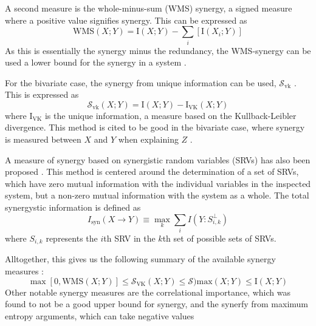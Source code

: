 \documentclass[../main.tex]{subfiles}
\begin{document}
A second measure is the whole-minus-sum (WMS) synergy, a signed measure where a positive value
signifies synergy.
This can be expressed as
%
\begin{equation}
\mathrm{WMS}(X;Y) = \mathrm{I}(X;Y) - \sum_i [\mathrm{I}(X_i;Y)]
\label{WMS}
\end{equation}
%
As this is essentially the synergy minus the redundancy, the WMS-synergy can be used a lower bound for the synergy in a system \cite{griffith2014quantifying, olbrich2015information}.

For the bivariate case, the synergy from unique information can be used, $\mathcal{S}_\mathrm{vk}$ \cite{bertschinger2014quantifying, griffith2014quantifying, olbrich2015information}.
This is expressed as
\begin{equation}
\mathcal{S}_\mathrm{vk} (X;Y) = \mathrm{I}(X;Y) - \mathrm{I}_\mathrm{VK} (X;Y)
\end{equation}
%
where $\mathrm{I}_\mathrm{VK}$ is the unique information, a measure based on the Kullback-Leibler divergence.
This method is cited to be good in the bivariate case, where synergy is measured between $X$ and $Y$ when explaining $Z$ \cite{olbrich2015information}.

A measure of synergy based on synergistic random variables (SRVs) has also been proposed \cite{quax2017quantifying}.
This method is centered around the determination of a set of SRVs, which have zero mutual information with the individual variables in the inspected system, but a non-zero mutual information with the system as a whole.
The total synergystic information is defined as
\begin{equation}
\label{SRV}
I_\mathrm{syn}(X \rightarrow Y) \equiv \max_k \sum_i I(Y : S_{i,k}^\perp)
\end{equation}
where $S_{i,k}$ represents the $i$th SRV in the $k$th set of possible sets of SRVs.

Alltogether, this gives us the following summary of the available synergy measures \cite{griffith2014quantifying}:
%
\begin{equation}
\max [0,\mathrm{WMS}(X;Y)] \le \mathcal{S}_\mathrm{VK} (X;Y) \le \mathcal{S})\mathrm{max} (X;Y) \le \mathrm{I}(X;Y)
\end{equation}
%
Other notable synergy measures are the correlational importance, which was found to not be a good upper bound for synergy, and the synerfy from maximum entropy arguments, which can take negative values \cite{griffith2014quantifying, olbrich2015information}
\end{document}
